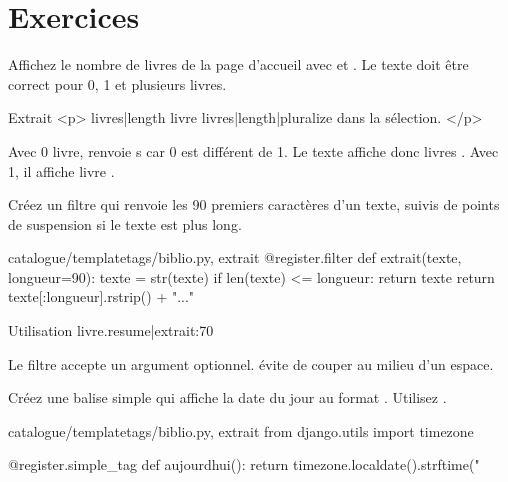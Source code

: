 \section{Exercices}

\begin{exercice}
Affichez le nombre de livres de la page d'accueil avec  et
. Le texte doit être correct pour 0, 1 et plusieurs livres.
\end{exercice}

\begin{correction}
\begin{codebox}[html]{Extrait}
<p>
  {{ livres|length }}
  livre{{ livres|length|pluralize }}
  dans la sélection.
</p>
\end{codebox}

Avec 0 livre,  renvoie \og s \fg{} car 0 est différent de 1. Le
texte affiche donc  livres \fg. Avec 1, il affiche  livre \fg.
\end{correction}

\begin{exercice}
Créez un filtre  qui renvoie les 90 premiers caractères d'un texte,
suivis de points de suspension si le texte est plus long.
\end{exercice}

\begin{correction}
\begin{codebox}[python]{catalogue/templatetags/biblio.py, extrait}
@register.filter
def extrait(texte, longueur=90):
    texte = str(texte)
    if len(texte) <= longueur:
        return texte
    return texte[:longueur].rstrip() + "..."
\end{codebox}

\begin{codebox}[html]{Utilisation}
{{ livre.resume|extrait:70 }}
\end{codebox}

Le filtre accepte un argument optionnel.  évite de couper au milieu
d'un espace.
\end{correction}

\begin{exercice}
Créez une balise simple  qui affiche la date du jour au format
. Utilisez .
\end{exercice}

\begin{correction}
\begin{codebox}[python]{catalogue/templatetags/biblio.py, extrait}
from django.utils import timezone


@register.simple_tag
def aujourdhui():
    return timezone.localdate().strftime("%
\end{codebox}

\end{correction}

